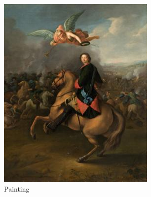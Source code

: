 \begin{figure}[htp]
\begin{subfigure}[t]{0.3\textwidth}
        \includegraphics[width=\linewidth]{imagenes/dataset_examples/painting.jpg}
        \caption*{Painting}
    \end{subfigure}
    \begin{subfigure}[t]{0.3\textwidth}
        \centering

\end{subfigure}
\end{figure}
